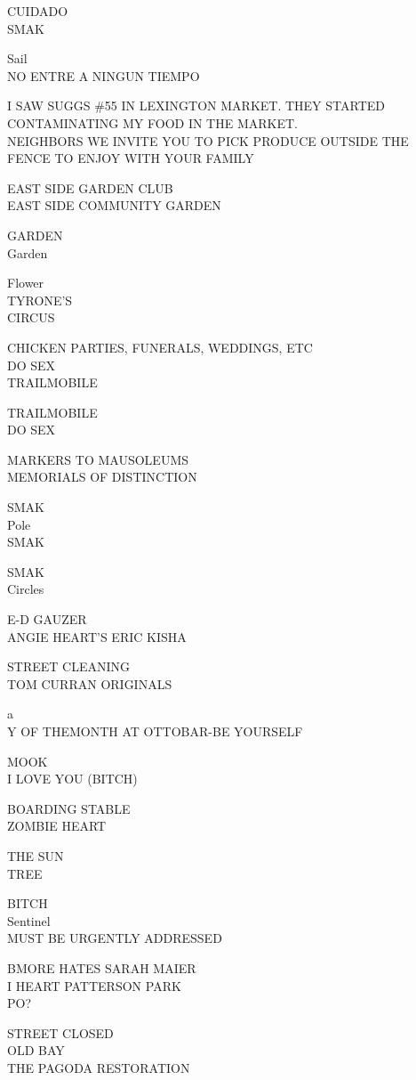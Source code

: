 \documentclass[10pt,letterpaper]{article}
\begin{document}
CUIDADO\\
SMAK

Sail\\
NO ENTRE A NINGUN TIEMPO

I SAW SUGGS \#55 IN LEXINGTON MARKET.  THEY STARTED CONTAMINATING MY FOOD IN THE MARKET.\\
NEIGHBORS WE INVITE YOU TO PICK PRODUCE OUTSIDE THE FENCE TO ENJOY WITH YOUR FAMILY

EAST SIDE GARDEN CLUB\\
EAST SIDE COMMUNITY GARDEN

GARDEN\\
Garden

Flower\\
TYRONE'S\\
CIRCUS

CHICKEN PARTIES, FUNERALS, WEDDINGS, ETC\\
DO SEX\\
TRAILMOBILE

TRAILMOBILE\\
DO SEX

MARKERS TO MAUSOLEUMS\\
MEMORIALS OF DISTINCTION

SMAK\\
Pole\\
SMAK

SMAK\\
Circles

E{-}D GAUZER\\
ANGIE HEART'S ERIC KISHA

STREET CLEANING\\
TOM CURRAN ORIGINALS

a\\
Y OF THEMONTH AT OTTOBAR{-}BE YOURSELF

MOOK\\
I LOVE YOU (BITCH)

BOARDING STABLE\\
ZOMBIE HEART

THE SUN\\
TREE

BITCH\\
Sentinel\\
MUST BE URGENTLY ADDRESSED

BMORE HATES SARAH MAIER\\
I HEART PATTERSON PARK\\
PO?

STREET CLOSED\\
OLD BAY\\
THE PAGODA RESTORATION
\end{document}
